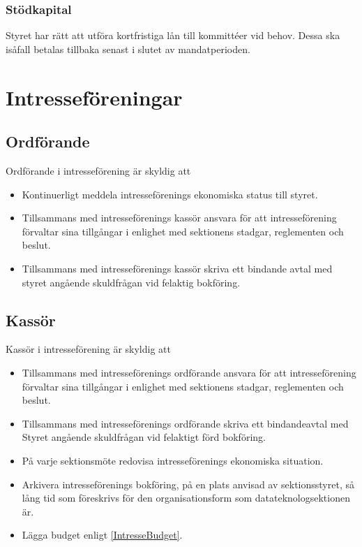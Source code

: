 \documentclass[a4paper]{dtek}
\begin{document}
\subsubsection{Stödkapital}
Styret har rätt att utföra kortfristiga lån till kommittéer vid behov. Dessa ska isåfall betalas tillbaka senast i slutet av mandatperioden.

\section{Intresseföreningar}
\subsection{Ordförande}
Ordförande i intresseförening är skyldig att
\begin{itemize}
  \item Kontinuerligt meddela intresseförenings ekonomiska status till styret.
  \item Tillsammans med intresseförenings kassör ansvara för att intresseförening förvaltar sina tillgångar i enlighet med sektionens stadgar, reglementen och beslut.
  \item Tillsammans med intresseförenings kassör skriva ett bindande avtal med styret angående skuldfrågan vid felaktig bokföring.
\end{itemize}

\subsection{Kassör}\label{IntresseKassör}
Kassör i intresseförening är skyldig att
\begin{itemize}
  \item Tillsammans med intresseförenings ordförande ansvara för att intresseförening förvaltar sina tillgångar i enlighet med sektionens stadgar, reglementen och beslut.
  \item Tillsammans med intresseförenings ordförande skriva ett bindandeavtal med Styret angående skuldfrågan vid felaktigt förd bokföring.
  \item På varje sektionsmöte redovisa intresseförenings ekonomiska situation.
  \item Arkivera intresseförenings bokföring, på en plats anvisad av sektionsstyret, så lång tid som föreskrivs för den organisationsform som datateknologsektionen är.
  \item Lägga budget enligt \ref{IntresseBudget}.
\end{itemize}
\end{document}
